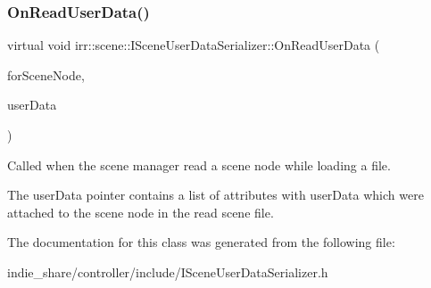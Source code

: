 \subsubsection{\texorpdfstring{On\+Read\+User\+Data()}{OnReadUserData()}\hspace{0.1cm}{\footnotesize\ttfamily [2/2]}}
{\footnotesize\ttfamily virtual void irr\+::scene\+::\+I\+Scene\+User\+Data\+Serializer\+::\+On\+Read\+User\+Data (\begin{DoxyParamCaption}\item[{\hyperlink{classirr_1_1scene_1_1ISceneNode}{I\+Scene\+Node} $\ast$}]{for\+Scene\+Node,  }\item[{\hyperlink{classirr_1_1io_1_1IAttributes}{io\+::\+I\+Attributes} $\ast$}]{user\+Data }\end{DoxyParamCaption})\hspace{0.3cm}{\ttfamily [pure virtual]}}



Called when the scene manager read a scene node while loading a file. 

The user\+Data pointer contains a list of attributes with user\+Data which were attached to the scene node in the read scene file. 

The documentation for this class was generated from the following file\+:\begin{DoxyCompactItemize}
\item 
indie\+\_\+share/controller/include/I\+Scene\+User\+Data\+Serializer.\+h\end{DoxyCompactItemize}
